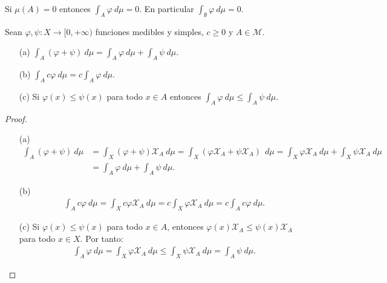 \begin{obs}
    \label{obs:vacio}
    Si $\mu(A) = 0$ entonces $\int_{A}{\varphi \ d\mu} = 0$. En particular $\int_{\emptyset}{\varphi \ d\mu}  =0$.
\end{obs}

\begin{prop}
    Sean $\varphi, \psi: X \longrightarrow [0,+\infty)$ funciones medibles y simples, $c \ge 0$ y $A \in \mathcal{M}$.
    \begin{enumerate}
        \item[(a)] $\int_{A}{(\varphi + \psi) \ d\mu} = \int_{A}{\varphi \ d\mu} + \int_{A}{\psi \ d\mu}$.
        \item[(b)] $\int_{A}{c\varphi \ d\mu} = c\int_{A}{\varphi \ d\mu}$.
        \item[(c)] Si $\varphi(x) \leq \psi(x)$ para todo $x \in A$ entonces $\int_{A}{\varphi \ d\mu} \leq \int_{A}{\psi \ d\mu}$.
    \end{enumerate}
\end{prop}

\begin{proof}
    \begin{enumerate}
        \item[(a)]
              \begin{align*}
                  \int_{A}{(\varphi + \psi) \ d\mu} & = \int_{X}{(\varphi + \psi)\mathcal{X}_{A} \ d\mu} = \int_{X}{(\varphi \mathcal{X}_{A} + \psi \mathcal{X}_{A})\ \ d\mu} =  \int_{X}{\varphi \mathcal{X}_{A} \ d\mu} + \int_{X}{\psi \mathcal{X}_{A} \ d\mu} \\
                                                    & = \int_{A}{\varphi \ d\mu} + \int_{A}{\psi \ d\mu}.
              \end{align*}
        \item[(b)]
              \begin{align*}
                  \int_{A}{c\varphi \ d\mu} = \int_{X}{c\varphi \mathcal{X}_{A} \ d\mu} = c\int_{X}{\varphi \mathcal{X}_{A} \ d\mu} = c\int_{A}{c\varphi \ d\mu}.
              \end{align*}
        \item[(c)] Si $\varphi(x) \leq \psi(x)$ para todo $x \in A$, entonces $\varphi(x) \mathcal{X}_{A} \leq \psi(x) \mathcal{X}_{A}$ para todo $x \in X$. Por tanto:
              \begin{align*}
                  \int_{A}{\varphi \ d\mu} = \int_{X}{\varphi \mathcal{X}_A \ d\mu} \leq \int_{X}{\psi \mathcal{X}_A \ d\mu} = \int_{A}{\psi \ d\mu}.
              \end{align*}
    \end{enumerate}
\end{proof}

